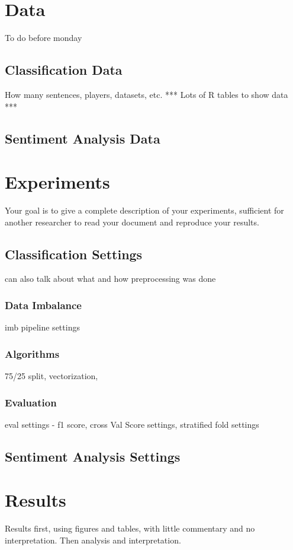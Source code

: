 \documentclass[oneside,12pt]{Classes/RoboticsLaTeX}
\begin{document}
\chapter{Data}
\label{chap:data}
To do before monday
\section{Classification Data}
\label{sec:class_data}
How many sentences, players, datasets, etc.
*** Lots of R tables to show data ***
\section{Sentiment Analysis Data}
\label{sec:senti_data}


\chapter{Experiments}
\label{chap:experiments}
Your goal is to give a complete description of your experiments, sufficient for 
another researcher to read your document and reproduce your results.

\section{Classification Settings}
can also talk about what and how preprocessing was done
\subsection{Data Imbalance}
imb pipeline settings

\subsection{Algorithms}
\label{sec:algor}
75/25 split, vectorization,
\subsection{Evaluation}
eval settings - f1 score, cross Val Score settings, stratified fold settings

\section{Sentiment Analysis Settings}


\chapter{Results}
\label{chap:results}
Results first, using figures and tables, with little commentary and no interpretation.
Then analysis and interpretation.
\end{document}

